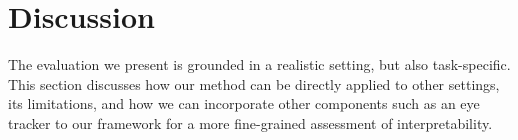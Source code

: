 \section{Discussion}
\label{sec:discussion}

%

%


The evaluation we present is grounded in a realistic setting, but also
task-specific. This section discusses how our method can be directly
applied to other settings, its limitations, and how we can incorporate
other components such as an eye tracker to our framework for a more
fine-grained assessment of interpretability.

